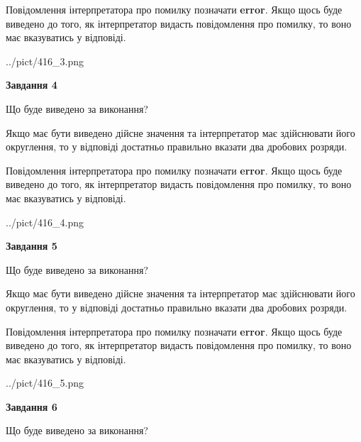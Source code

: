 \documentclass[12pt, ukrainian]{article}
\begin{document}
{\begin {Large}
Повідомлення інтерпретатора про помилку позначати \textbf{error}.
Якщо щось буде виведено до того, як інтерпретатор видасть повідомлення про помилку, 
то воно має вказуватись у відповіді. \par

\begin{center}
	{../pict/416_3.png}
\end{center}
\newpage

{\begin {center}\textbf{Завдання 4}\end {center}}\par
Що буде виведено за виконання? \par

Якщо має бути виведено дійсне значення та інтерпретатор має здійснювати його округлення, 
то у відповіді достатньо правильно вказати два дробових розряди.

Повідомлення інтерпретатора про помилку позначати \textbf{error}.
Якщо щось буде виведено до того, як інтерпретатор видасть повідомлення про помилку, 
то воно має вказуватись у відповіді. \par

\begin{center}
	{../pict/416_4.png}
\end{center}
\newpage

{\begin {center}\textbf{Завдання 5}\end {center}}\par
Що буде виведено за виконання? \par

Якщо має бути виведено дійсне значення та інтерпретатор має здійснювати його округлення, 
то у відповіді достатньо правильно вказати два дробових розряди.

Повідомлення інтерпретатора про помилку позначати \textbf{error}.
Якщо щось буде виведено до того, як інтерпретатор видасть повідомлення про помилку, 
то воно має вказуватись у відповіді. \par

\begin{center}
	{../pict/416_5.png}
\end{center}
\newpage

{\begin {center}\textbf{Завдання 6}\end {center}}\par
Що буде виведено за виконання? \par


\end{Large}}
\end{document}

